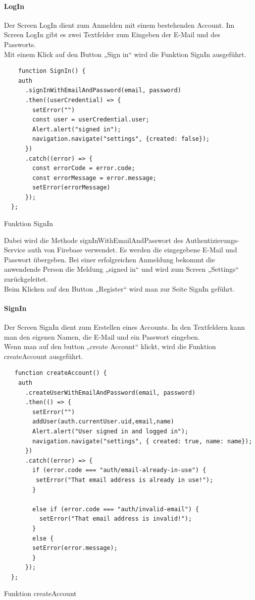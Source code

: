 \paragraph{LogIn}Der Screen LogIn dient zum Anmelden mit einem bestehenden Account. Im Screen LogIn gibt es zwei Textfelder zum Eingeben der E-Mail und des Passworts. \\
Mit einem Klick auf den Button „Sign in“ wird die Funktion SignIn ausgeführt. \\
\begin{listing}[H]
  \begin{verbatim}
    function SignIn() {
    auth
      .signInWithEmailAndPassword(email, password)
      .then((userCredential) => {
        setError("")
        const user = userCredential.user;
        Alert.alert("signed in");
        navigation.navigate("settings", {created: false});
      })
      .catch((error) => {
        const errorCode = error.code;
        const errorMessage = error.message;
        setError(errorMessage)
      });
  };
\end{verbatim}
  \caption{Funktion SignIn}
  \label{lst:signin}
\end{listing}

Dabei wird die Methode signInWithEmailAndPasswort des Authentizierungs-Service auth von Firebase verwendet. Es werden die eingegebene E-Mail und Passwort übergeben. Bei einer erfolgreichen Anmeldung bekommt die anwendende Person die Meldung „signed in“ und wird zum Screen „Settings“ zurückgeleitet.\\
Beim Klicken auf den Button „Register“ wird man zur Seite SignIn geführt.\\


\paragraph{SignIn}Der Screen SignIn dient zum Erstellen eines Accounts. In den Textfeldern kann man den eigenen Namen, die E-Mail und ein Passwort eingeben.\\
Wenn man auf den button „create Account“ klickt, wird die Funktion createAccount ausgeführt.\\
\begin{listing}[H]
  \begin{verbatim}
   function createAccount() {
    auth
      .createUserWithEmailAndPassword(email, password)
      .then(() => {
        setError("")
        addUser(auth.currentUser.uid,email,name)
        Alert.alert("User signed in and logged in");
        navigation.navigate("settings", { created: true, name: name});
      })
      .catch((error) => {
        if (error.code === "auth/email-already-in-use") {
         setError("That email address is already in use!");
        }

        else if (error.code === "auth/invalid-email") {
          setError("That email address is invalid!");
        }
        else {
        setError(error.message);
        }
      });
  };
\end{verbatim}
  \caption{Funktion createAccount}
  \label{lst:createaccount}
\end{listing}

